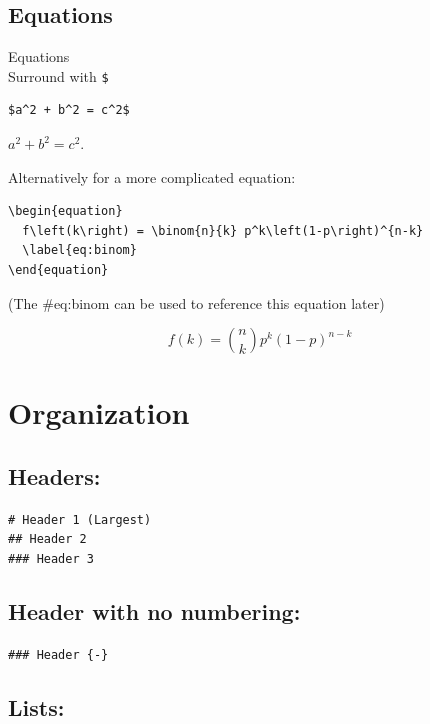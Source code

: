 \documentclass[
]{book}
\begin{document}
\hypertarget{equations}{%
\subsection{Equations}\label{equations}}

Equations\\
Surround with \texttt{\$}

\begin{verbatim}
$a^2 + b^2 = c^2$  
\end{verbatim}

\(a^2 + b^2 = c^2\).

Alternatively for a more complicated equation:

\begin{verbatim}
\begin{equation} 
  f\left(k\right) = \binom{n}{k} p^k\left(1-p\right)^{n-k}
  \label{eq:binom}
\end{equation} 
\end{verbatim}

(The \#eq:binom can be used to reference this equation later)

\begin{equation} 
  f\left(k\right) = \binom{n}{k} p^k\left(1-p\right)^{n-k}
  \label{eq:binom}
\end{equation}

\hypertarget{organization}{%
\section{Organization}\label{organization}}

\hypertarget{headers}{%
\subsection{Headers:}\label{headers}}

\texttt{\#\ Header\ 1\ (Largest)}~\\
\texttt{\#\#\ Header\ 2}~\\
\texttt{\#\#\#\ Header\ 3}

\hypertarget{header-with-no-numbering}{%
\subsection*{Header with no numbering:}\label{header-with-no-numbering}}

\texttt{\#\#\#\ Header\ \{-\}}

\hypertarget{lists}{%
\subsection{Lists:}\label{lists}}
\end{document}
